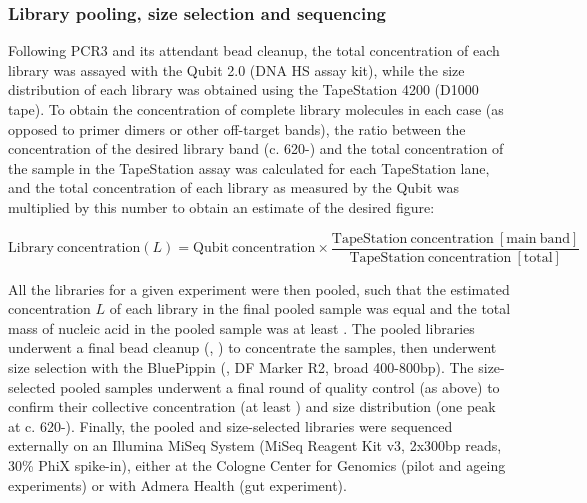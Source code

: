\subsubsection{Library pooling, size selection and sequencing} 
\label{sec:methods_molec_igseq_seq}

Following PCR3 and its attendant bead cleanup, the total concentration of each library was assayed with the Qubit 2.0 (DNA HS assay kit), while the size distribution of each library was obtained using the TapeStation 4200 (D1000 tape). To obtain the concentration of complete library molecules in each case (as opposed to primer dimers or other off-target bands), the ratio between the concentration of the desired library band (c. 620-) and the total concentration of the sample in the TapeStation assay was calculated for each TapeStation lane, and the total concentration of each library as measured by the Qubit was multiplied by this number to obtain an estimate of the desired figure:

\begin{equation}
\mathrm{Library~concentration} (L) = \mathrm{Qubit~concentration} \times \frac{\mathrm{TapeStation~concentration~[main~band]}}{\mathrm{TapeStation~concentration~[total]}}
\label{eq:library-conc}
\end{equation}

\noindent All the libraries for a given experiment were then pooled, such that the estimated concentration $L$ of each library in the final pooled sample was equal and the total mass of nucleic acid in the pooled sample was at least . The pooled libraries underwent a final bead cleanup (, ) to concentrate the samples, then underwent size selection with the BluePippin (,  DF Marker R2, broad 400-800bp). The size-selected pooled samples underwent a final round of quality control (as above) to confirm their collective concentration (at least ) and size distribution (one peak at c. 620-). Finally, the pooled and size-selected libraries were sequenced externally on an Illumina MiSeq System (MiSeq Reagent Kit v3, 2x300bp reads, 30\% PhiX spike-in), either at the Cologne Center for Genomics (pilot and ageing experiments) or with Admera Health (gut experiment).



